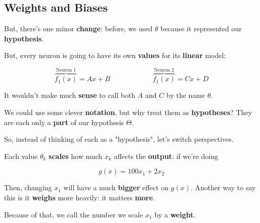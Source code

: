     \subsection{Weights and Biases}
    
        But, there's one minor \textbf{change}: before, we used $\theta$ because it represented our \textbf{hypothesis}. 
        
        But, every neuron is going to have its own \textbf{values} for its \textbf{linear} model:
        
        \begin{equation}
            \overbrace{
                f_1(x)
            }^{\text{Neuron 1}}
            = Ax+B 
            \qquad \qquad \qquad
            \overbrace{
                f_1(x)
            }^{\text{Neuron 2}}
            = Cx+D
        \end{equation}
        
        It wouldn't make much \textbf{sense} to call both $A$ and $C$ by the name $\theta$. 
        
        We could use some clever \textbf{notation}, but why treat them as \textbf{hypotheses}? They are each only a \textbf{part} of our hypothesis $\Theta$.
        
        So, instead of thinking of each as a "hypothesis", let's switch perspectives.
        
        Each value $\theta_k$ \textbf{scales} how much $x_k$ affects the \textbf{output}: if we're doing
        
        \begin{equation}
            g(x) = 100x_1+2x_2
        \end{equation}
        
        Then, changing $x_1$ will have a much \textbf{bigger} effect on $g(x)$. Another way to say this is it \textbf{weighs} more heavily: it matters \textbf{more}.
        
        Because of that, we call the number we scale $x_1$ by a \textbf{weight}.\\
        
